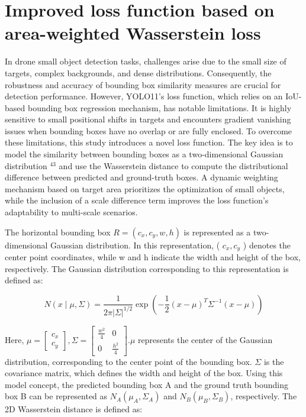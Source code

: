 \documentclass{article}
\begin{document}
\section*{Improved loss function based on area-weighted Wasserstein loss}
In drone small object detection tasks, challenges arise due to the small size of targets, complex backgrounds, and dense distributions. Consequently, the robustness and accuracy of bounding box similarity measures are crucial for detection performance. However, YOLO11's loss function, which relies on an IoU-based bounding box regression mechanism, has notable limitations. It is highly sensitive to small positional shifts in targets and encounters gradient vanishing issues when bounding boxes have no overlap or are fully enclosed. To overcome these limitations, this study introduces a novel loss function. The key idea is to model the similarity between bounding boxes as a two-dimensional Gaussian distribution ${ }^{43}$ and use the Wasserstein distance to compute the distributional difference between predicted and ground-truth boxes. A dynamic weighting mechanism based on target area prioritizes the optimization of small objects, while the inclusion of a scale difference term improves the loss function's adaptability to multi-scale scenarios.

The horizontal bounding box $R=\left(c_{x}, c_{y}, w, h\right)$ is represented as a two-dimensional Gaussian distribution. In this representation, ( $c_{x}, c_{y}$ ) denotes the center point coordinates, while w and h indicate the width and height of the box, respectively. The Gaussian distribution corresponding to this representation is defined as:


\begin{equation*}
N(x \mid \mu, \Sigma)=\frac{1}{2 \pi|\Sigma|^{1 / 2}} \exp \left(-\frac{1}{2}(x-\mu)^{T} \Sigma^{-1}(x-\mu)\right) \tag{10}
\end{equation*}


Here, $\mu=\left[\begin{array}{l}c_{x} \\ c_{y}\end{array}\right], \Sigma=\left[\begin{array}{cc}\frac{w^{2}}{4} & 0 \\ 0 & \frac{h^{2}}{4}\end{array}\right] . \mu$ represents the center of the Gaussian distribution, corresponding to the center point of the bounding box. $\Sigma$ is the covariance matrix, which defines the width and height of the box. Using this model concept, the predicted bounding box A and the ground truth bounding box B can be represented as $N_{A}\left(\mu_{A}, \Sigma_{A}\right)$ and $N_{B}\left(\mu_{B}, \Sigma_{B}\right)$, respectively. The 2D Wasserstein distance is defined as:
\end{document}
